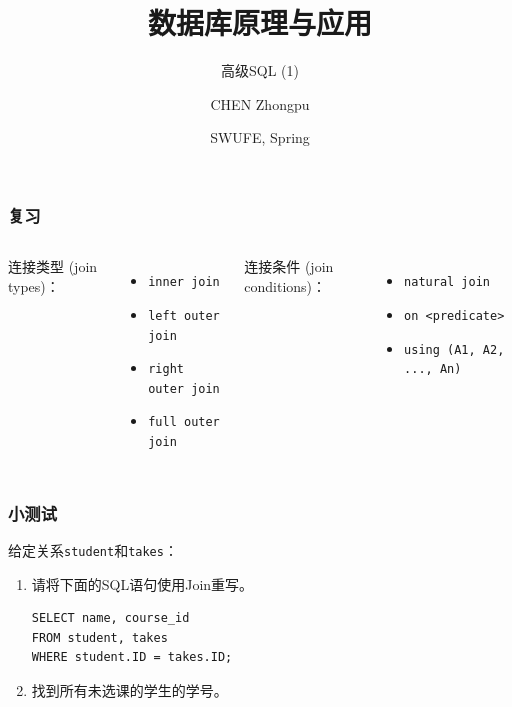 \documentclass[aspectratio=169, 14pt]{beamer}
\title[Database Principles and Applications] %
{数据库原理与应用}
\subtitle{高级SQL (1)}
\author[CHEN Zhongpu] %
{CHEN Zhongpu}
\institute[] %
{
  School of Computing and Artificial Intelligence \\
  \href{mailto:zpchen@swufe.edu.cn}{zpchen@swufe.edu.cn}
}
\date[] %
{SWUFE, Spring \the\year{}}
\begin{document}
\frame{\titlepage}

\begin{frame}
    \frametitle{复习}
    \begin{columns}
        连接类型 (join types)：
        \begin{itemize}
            \item \texttt{inner join}
            \item \texttt{left outer join}
            \item \texttt{right outer join}
            \item \texttt{full outer join}
        \end{itemize}
        连接条件 (join conditions)：
        \begin{itemize}
            \item \texttt{natural join}
            \item \texttt{on <predicate>}
            \item \texttt{using (A1, A2, ..., An)}
        \end{itemize}
    \end{columns}
\end{frame}

\begin{frame}[fragile]
    \frametitle{小测试}
给定关系\texttt{student}和\texttt{takes}：
\begin{enumerate}
    \item 请将下面的SQL语句使用Join重写。
    \begin{verbatim}
SELECT name, course_id
FROM student, takes
WHERE student.ID = takes.ID;
    \end{verbatim}
    \item 找到所有未选课的学生的学号。
\end{enumerate}


\end{frame}
\end{document}
